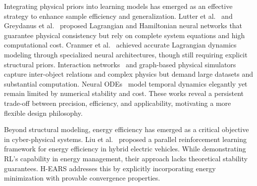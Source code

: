 \documentclass[journal]{IEEEtran}
\begin{document}
	Integrating physical priors into learning models has emerged as an effective strategy to enhance sample efficiency and generalization. Lutter et al.~\cite{lutter2019deep} and Greydanus et al.~\cite{greydanus2019hamiltonian} proposed Lagrangian and Hamiltonian neural networks that guarantee physical consistency but rely on complete system equations and high computational cost. Cranmer et al.~\cite{cranmer2020lagrangian} achieved accurate Lagrangian dynamics modeling through specialized neural architectures, though still requiring explicit structural priors. Interaction networks~\cite{battaglia2016interaction} and graph-based physical simulators~\cite{sanchez2020learning} capture inter-object relations and complex physics but demand large datasets and substantial computation. Neural ODEs~\cite{chen2018neural} model temporal dynamics elegantly yet remain limited by numerical stability and cost. These works reveal a persistent trade-off between precision, efficiency, and applicability, motivating a more flexible design philosophy.
	
	Beyond structural modeling, energy efficiency has emerged as a critical objective in cyber-physical systems. Liu et al.~\cite{liu2020parallel} proposed a parallel reinforcement learning framework for energy efficiency in hybrid electric vehicles. While demonstrating RL's capability in energy management, their approach lacks theoretical stability guarantees. H-EARS addresses this by explicitly incorporating energy minimization with provable convergence properties.
	
\end{document}
